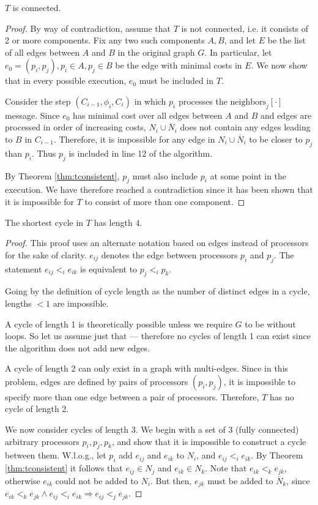 \begin{theorem}
$T$ is connected.
\end{theorem}

\begin{proof}
By way of contradiction, assume that $T$ is not connected, i.e. it consists of 2
or more components. Fix any two such components $A, B$, and let $E$ be the list
of all edges between $A$ and $B$ in the original graph $G$. In particular, let
$e_0 = (p_i, p_j), p_i \in A, p_j \in B$ be the edge with minimal costs in $E$.
We now show that in every 
possible execution, $e_0$ must be included in $T$.

Consider the step $(C_{i-1}, \phi_i, C_i)$ in which $p_i$ processes the 
$\text{neighbors}_j[\cdot]$ message. Since $e_0$ has minimal cost over all edges
between $A$ and $B$ and edges are processed in order of increasing costs,
$N_i \cup \overline{N}_i$ does not contain any edges
leading to $B$ in $C_{i-1}$. Therefore, it is impossible for any edge in 
$N_i \cup \overline{N}_i$ to be closer to $p_j$ than $p_i$. Thus $p_j$
is included in line 12 of the algorithm.

By Theorem \ref{thm:tconsistent}, $p_j$ must also include $p_i$ at some point
in the execution. We have therefore reached a contradiction since it has been
shown that it is impossible for $T$ to consist of more than one component.
\end{proof}

\begin{theorem}
The shortest cycle in $T$ has length $4$.
\end{theorem}

\begin{proof}
This proof uses an alternate notation based on edges instead of processors for
the sake of clarity. $e_{ij}$ denotes the edge between processors $p_i$ and $p_j$.
The statement $e_{ij} <_i e_{ik}$ is equivalent to $p_j <_i p_k$.

Going by the definition of cycle length as the number of distinct edges in a
cycle, lengths $< 1$ are impossible.

A cycle of length 1 is theoretically possible unless we require $G$ to be
without loops. So let us assume just that --- therefore no cycles of length
1 can exist since the algorithm does not add new edges.

A cycle of length 2 can only exist in a graph with multi-edges. 
Since in this problem, edges are defined by pairs of processors $(p_i, p_j)$,
it is impossible to specify more than one edge between a pair of processors.
Therefore, $T$ has no cycle of length 2.

We now consider cycles of length 3. We begin with a set of 3 (fully connected)
arbitrary processors
$p_i, p_j, p_k$, and show that it is impossible to construct a cycle between them.
W.l.o.g., let $p_i$ add $e_{ij}$ and $e_{ik}$ to $N_i$, and $e_{ij} <_i e_{ik}$.
By Theorem \ref{thm:tconsistent} it follows that $e_{ij} \in N_j$ and $e_{ik}
\in N_k$. Note that $e_{ik} <_k e_{jk}$, otherwise $e_{ik}$ could not be added
to $N_i$. But then, $e_{jk}$ must be added to $\overline{N}_k$, since
 $e_{ik} <_k e_{jk} \wedge e_{ij} <_i e_{ik} \Rightarrow e_{ij} <_j e_{jk}$.
\end{proof}

